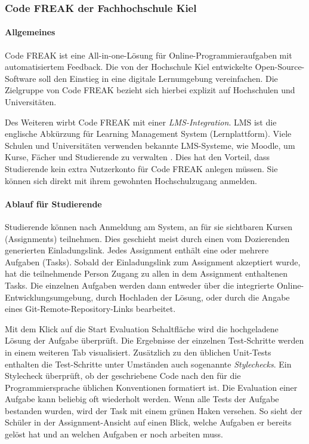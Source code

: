 \newpage
\subsubsection{Code FREAK der Fachhochschule Kiel}\label{code-freak}
\paragraph{Allgemeines}
Code FREAK ist eine All-in-one-Lösung für Online-Programmieraufgaben mit
automatisiertem Feedback. Die von der Hochschule Kiel entwickelte
Open-Source-Software soll den Einstieg in eine digitale Lernumgebung
vereinfachen. Die Zielgruppe von Code FREAK bezieht sich hierbei explizit auf
Hochschulen und Universitäten. \parencite{codefreak-startseite}

Des Weiteren wirbt Code FREAK mit einer \emph{LMS-Integration}. LMS ist die
englische Abkürzung für Learning Management System (Lernplattform). Viele
Schulen und Universitäten verwenden bekannte LMS-Systeme, wie Moodle, um Kurse,
Fächer und Studierende zu verwalten \parencite{moodle}. Dies hat den Vorteil,
dass Studierende kein extra Nutzerkonto für Code FREAK anlegen müssen. Sie
können sich direkt mit ihrem gewohnten Hochschulzugang anmelden.

\paragraph{Ablauf für Studierende}
Studierende können nach Anmeldung am System, an für sie sichtbaren Kursen
(Assignments) teilnehmen. Dies geschieht meist durch einen vom Dozierenden
generierten Einladungslink. Jedes Assignment enthält eine oder mehrere Aufgaben
(Tasks). Sobald der Einladungslink zum Assignment akzeptiert wurde, hat die
teilnehmende Person Zugang zu allen in dem Assignment enthaltenen Tasks. Die
einzelnen Aufgaben werden dann entweder über die integrierte
Online-Entwicklungsumgebung, durch Hochladen der Lösung, oder durch die Angabe
eines Git-Remote-Repository-Links bearbeitet.

Mit dem Klick auf die \glqq Start Evaluation\grqq{} Schaltfläche wird die
hochgeladene Lösung der Aufgabe überprüft. Die Ergebnisse der einzelnen
Test-Schritte werden in einem weiteren Tab visualisiert. Zusätzlich zu den
üblichen Unit-Tests enthalten die Test-Schritte unter Umständen auch
sogenannte \emph{Stylechecks}. Ein Stylecheck überprüft, ob der geschriebene
Code nach den für die Programmiersprache üblichen Konventionen formatiert ist.
Die Evaluation einer Aufgabe kann beliebig oft wiederholt werden. Wenn alle
Tests der Aufgabe bestanden wurden, wird der Task mit einem grünen Haken
versehen. So sieht der Schüler in der Assignment-Ansicht auf einen Blick, welche
Aufgaben er bereits gelöst hat und an welchen Aufgaben er noch arbeiten muss.

